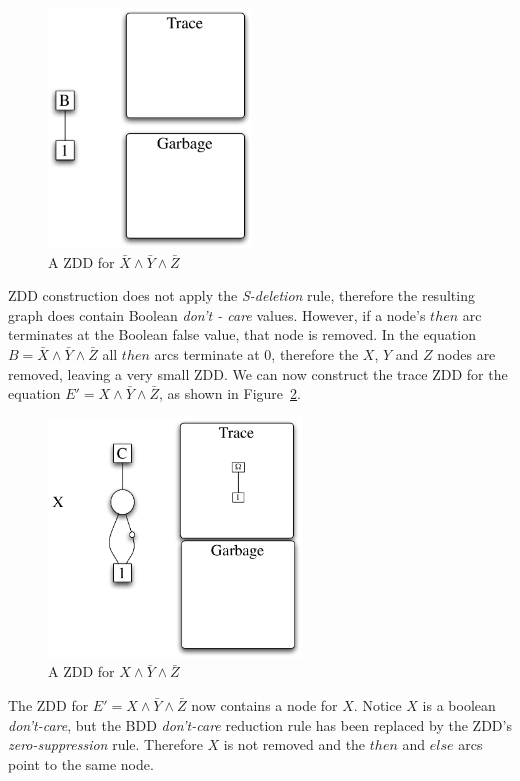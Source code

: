 \documentclass[defaultstyle,11pt]{thesis}
\begin{document}
\begin{figure}
  \centering
  \includegraphics[height=2.5in]{figures/zddtrace01}
  \caption{A ZDD for $\bar{X}\land\bar{Y}\land\bar{Z}$}
  \label{fig:zddtrace01}
\end{figure}

ZDD construction does not apply the \textit{S-deletion} rule, therefore
the resulting graph does contain Boolean \textit{don't - care} values.
However, if a node's $then$ arc terminates at the Boolean false value,
that node is removed.  In the equation $B =
\bar{X}\land\bar{Y}\land\bar{Z}$ all $then$ arcs terminate at 0,
therefore the $X$, $Y$ and $Z$ nodes are removed, leaving a very small
ZDD. We can now construct the trace ZDD for the equation $E' =
X\land\bar{Y}\land\bar{Z}$, as shown in Figure~\ref{fig:zddtrace02}.

\begin{figure}
  \centering
  \includegraphics[height=2.5in]{figures/zddtrace02}
  \caption{A ZDD for $X\land\bar{Y}\land\bar{Z}$}
  \label{fig:zddtrace02}
\end{figure}

The ZDD for $E' = X\land\bar{Y}\land\bar{Z}$ now contains a node for
$X$.  Notice $X$ is a boolean \textit{don't-care}, but the BDD
\textit{don't-care} reduction rule has been replaced by the ZDD's
\textit{zero-suppression} rule.  Therefore $X$ is not removed and the $then$
and $else$ arcs point to the same node.
\end{document}
